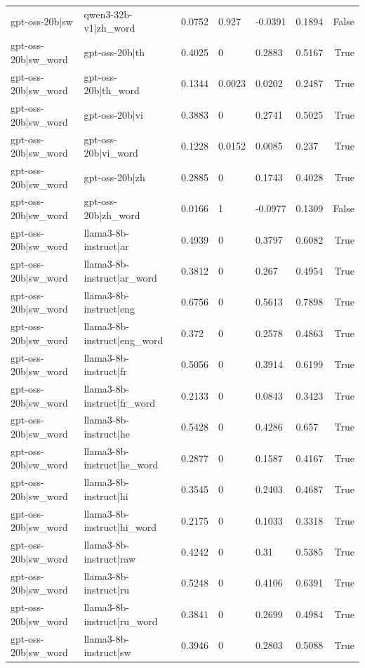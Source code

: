 \begin{table}
\begin{tabular}{llllllr}
gpt-oss-20b|sw & qwen3-32b-v1|zh_word & 0.0752 & 0.927 & -0.0391 & 0.1894 & False \\
gpt-oss-20b|sw_word & gpt-oss-20b|th & 0.4025 & 0 & 0.2883 & 0.5167 & True \\
gpt-oss-20b|sw_word & gpt-oss-20b|th_word & 0.1344 & 0.0023 & 0.0202 & 0.2487 & True \\
gpt-oss-20b|sw_word & gpt-oss-20b|vi & 0.3883 & 0 & 0.2741 & 0.5025 & True \\
gpt-oss-20b|sw_word & gpt-oss-20b|vi_word & 0.1228 & 0.0152 & 0.0085 & 0.237 & True \\
gpt-oss-20b|sw_word & gpt-oss-20b|zh & 0.2885 & 0 & 0.1743 & 0.4028 & True \\
gpt-oss-20b|sw_word & gpt-oss-20b|zh_word & 0.0166 & 1 & -0.0977 & 0.1309 & False \\
gpt-oss-20b|sw_word & llama3-8b-instruct|ar & 0.4939 & 0 & 0.3797 & 0.6082 & True \\
gpt-oss-20b|sw_word & llama3-8b-instruct|ar_word & 0.3812 & 0 & 0.267 & 0.4954 & True \\
gpt-oss-20b|sw_word & llama3-8b-instruct|eng & 0.6756 & 0 & 0.5613 & 0.7898 & True \\
gpt-oss-20b|sw_word & llama3-8b-instruct|eng_word & 0.372 & 0 & 0.2578 & 0.4863 & True \\
gpt-oss-20b|sw_word & llama3-8b-instruct|fr & 0.5056 & 0 & 0.3914 & 0.6199 & True \\
gpt-oss-20b|sw_word & llama3-8b-instruct|fr_word & 0.2133 & 0 & 0.0843 & 0.3423 & True \\
gpt-oss-20b|sw_word & llama3-8b-instruct|he & 0.5428 & 0 & 0.4286 & 0.657 & True \\
gpt-oss-20b|sw_word & llama3-8b-instruct|he_word & 0.2877 & 0 & 0.1587 & 0.4167 & True \\
gpt-oss-20b|sw_word & llama3-8b-instruct|hi & 0.3545 & 0 & 0.2403 & 0.4687 & True \\
gpt-oss-20b|sw_word & llama3-8b-instruct|hi_word & 0.2175 & 0 & 0.1033 & 0.3318 & True \\
gpt-oss-20b|sw_word & llama3-8b-instruct|raw & 0.4242 & 0 & 0.31 & 0.5385 & True \\
gpt-oss-20b|sw_word & llama3-8b-instruct|ru & 0.5248 & 0 & 0.4106 & 0.6391 & True \\
gpt-oss-20b|sw_word & llama3-8b-instruct|ru_word & 0.3841 & 0 & 0.2699 & 0.4984 & True \\
gpt-oss-20b|sw_word & llama3-8b-instruct|sw & 0.3946 & 0 & 0.2803 & 0.5088 & True \\

\end{tabular}
\end{table}
